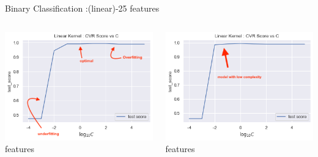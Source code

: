 \documentclass[12pt,t]{beamer}
\begin{document}
\begin{frame}[t]{Binary Classification :(linear)-25 features}
    \scriptsize

    \begin{columns}
        \begin{column}[T]{0.50\linewidth}
            \includegraphics[width=\linewidth]{images/p1a/2(binary clf)/classes1and4_libsvm_linear10f.png}
             features
        \end{column}
        \begin{column}[T]{0.50\linewidth}
            \includegraphics[width=\linewidth]{images/p1a/2(binary clf)/classes1and4_libsvm_linear25f.png}
             features
        \end{column}
    \end{columns}


\end{frame}
\end{document}
